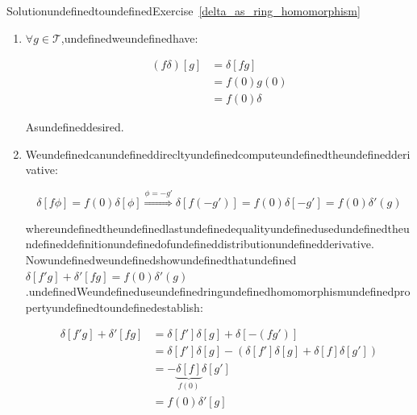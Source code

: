 \begin{mystsolution}{SolutionundefinedtoundefinedExercise~\ref{delta_as_ring_homomorphism}}\begin{enumerate}
\item $\forall g\in \mathcal T$,undefinedweundefinedhave:

\begin{equation}
\begin{aligned}
(f\delta)[g] &= \delta[fg] \\
&=f(0)g(0) \\
&= f(0)\delta
\end{aligned}
\end{equation}


Asundefineddesired.


\item Weundefinedcanundefineddirecltyundefinedcomputeundefinedtheundefinedderivative:

\begin{equation}
\delta[f\phi] = f(0)\delta[\phi] \overset{\phi=-g'}{\Longrightarrow} \delta[f(-g')] = f(0)\delta[-g'] = f(0)\delta'(g)
\end{equation}


whereundefinedtheundefinedlastundefinedequalityundefinedusedundefinedtheundefineddefinitionundefinedofundefineddistributionundefinedderivative.
Nowundefinedweundefinedshowundefinedthatundefined$\delta[f'g]+\delta'[fg]=f(0)\delta'(g)$.undefinedWeundefineduseundefinedringundefinedhomomorphismundefinedpropertyundefinedtoundefinedestablish:

\begin{equation}
\begin{aligned}
\delta[f'g]+\delta'[fg] &= \delta[f']\delta[g]+\delta[-(fg')] \\
&= \delta[f']\delta[g]-(\delta[f']\delta[g]+\delta[f]\delta[g']) \\
&= -\underbrace{\delta[f]}_{f(0)}\delta[g'] \\
&= f(0)\delta'[g] \\
\end{aligned}
\end{equation}
\end{enumerate}

\end{mystsolution}
